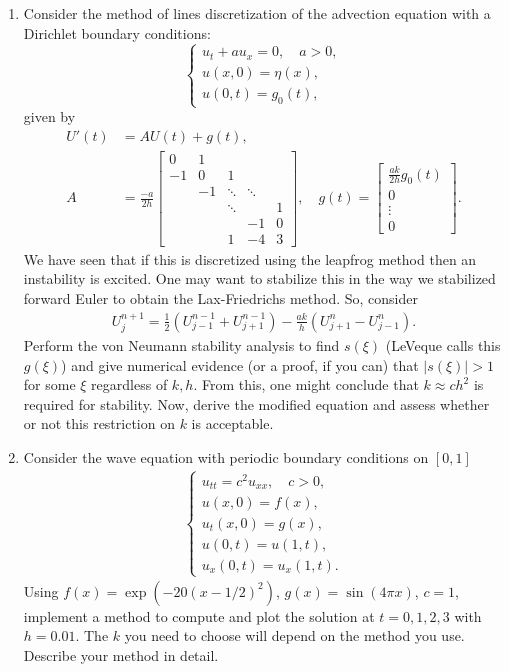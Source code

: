\documentclass[10pt]{amsart}
\begin{document}
\begin{enumerate}[label={\bf Problem~{\arabic*}:}]
  \mline
\item Consider the method of lines discretization of the advection equation with a Dirichlet boundary conditions:
  $$ \begin{cases} u_t + a u_{x} = 0, \quad a > 0,\\
u(x,0) = \eta(x),\\
u(0,t) = g_0(t), \end{cases} $$
given by
\begin{align*}
  U'(t) &= A U(t) + g(t),\\
  A &= \frac{-a}{2h} \begin{bmatrix} 0 & 1 \\
    -1 & 0 & 1 \\
    & -1 & \ddots & \ddots \\
    && \ddots && 1\\
    &&& -1 & 0 \\
    &&1 & -4 & 3
  \end{bmatrix}, \quad g(t) = \begin{bmatrix} \frac{ak}{2h} g_0(t) \\ 0 \\ \vdots \\ 0 \end{bmatrix}.
\end{align*}
We have seen that if this is discretized using the leapfrog method then an instability is excited.  One may want to stabilize this in the way we stabilized forward Euler to obtain the Lax-Friedrichs method.  So, consider
\begin{align*}
  U_j^{n+1} = \frac 1 2 ( U_{j-1}^{n-1} + U_{j+1}^{n-1}) - \frac{ak}{h} ( U_{j+1}^n - U_{j-1}^n).
\end{align*}
Perform the von Neumann stability analysis to find $s(\xi)$ (LeVeque calls this $g(\xi)$) and give numerical evidence (or a proof, if you can) that $|s(\xi)| > 1$ for some $\xi$ regardless of $k,h$.  From this, one might conclude that $k \approx c h^2$ is required for stability.  Now, derive the modified equation and assess whether or not this restriction on $k$ is acceptable.

\mline
\item Consider the wave equation with periodic boundary conditions on $[0,1]$
  \begin{align*}
    \begin{cases}
      u_{tt} = c^2 u_{xx}, \quad c > 0,\\
      u(x,0) = f(x),\\
      u_t(x,0) = g(x),\\
      u(0,t) = u(1,t),\\
      u_x(0,t) = u_x(1,t).
    \end{cases}
  \end{align*}
  Using $f(x) = \exp( -20(x-1/2)^2 )$, $g(x) = \sin(4\pi x)$, $c = 1$, implement a method to compute and plot the solution at $t = 0,1,2,3$ with $h = 0.01$.  The $k$ you need to choose will depend on the method you use.  Describe your method in detail.


\end{enumerate}
\end{document}
